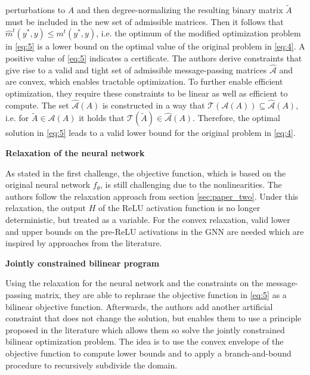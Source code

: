 \documentclass[a4paper,preprint]{sig-alternate}
\begin{document}
perturbations to $A$ and then degree-normalizing the resulting binary matrix $\tilde{A}$ must be included in the new set of admissible matrices.
Then it follows that $\hat{m}^t (y^{\ast}, y) \leq m^t (y^{\ast}, y)$, i.e. the optimum of the modified optimization problem in
\ref{eq:5} is a lower bound on the optimal value of the original problem in \ref{eq:4}. A positive value of \ref{eq:5} indicates a certificate.
The authors derive constraints that give rise to a valid and tight set of admissible message-passing matrices $\mathcal{\hat{A}}$
and are convex, which enables tractable optimization. To further enable efficient optimization, they require these constraints to be linear
as well as efficient to compute. The set $\mathcal{\hat{A}}(A)$ is constructed in a way that $\mathcal{T}(\mathcal{A}(A)) \subseteq \mathcal{\hat{A}}(A)$,
i.e. for $\tilde{A} \in \mathcal{A}(A)$ it holds that $\mathcal{T}(\tilde{A}) \in \mathcal{\hat{A}}(A)$.
Therefore, the optimal solution in \ref{eq:5} leads to a valid lower bound for the original problem in \ref{eq:4}.\newline

\textbf{Relaxation of the neural network}\newline

As stated in the first challenge, the objective function, which is based on the original neural network $f_{\theta}$, is still challenging
due to the nonlinearities. The authors follow the relaxation approach from section \ref{sec:paper_two}. Under this relaxation, 
the output $H$ of the ReLU activation function is no longer deterministic, but treated as a variable. For the convex relaxation,
valid lower and upper bounds on the pre-ReLU activations in the GNN are needed which are inspired by approaches from the literature.\newline

\textbf{Jointly constrained bilinear program}\newline

Using the relaxation for the neural network and the constraints on the message-passing matrix, they are able to
rephrase the objective function in \ref{eq:5} as a bilinear objective function.
Afterwards, the authors add another artificial constraint that does not change the solution, but enables them to use 
a principle proposed in the literature which allows them so solve the jointly constrained 
bilinear optimization problem. The idea is to use the convex envelope of the objective function to compute lower bounds 
and to apply a branch-and-bound procedure to recursively subdivide the domain.\newline
\end{document}
